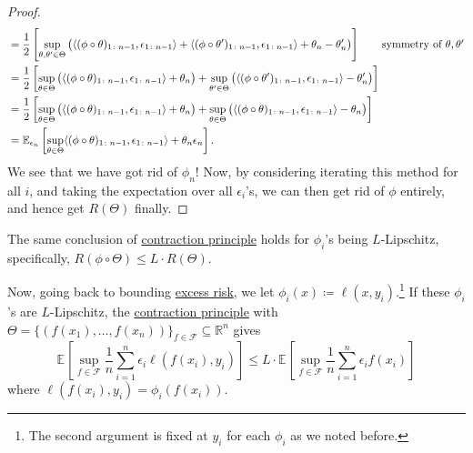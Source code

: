 \begin{proof}
\begin{align*}
		 & = \frac{1}{2} \left[ \sup _{\theta , \theta ^{\prime} \in \Theta } \big(\langle (\phi \circ \theta )_{1 \colon n-1}, \epsilon _{1 \colon n-1} \rangle+ \langle (\phi \circ \theta ^{\prime} )_{1\colon n-1} , \epsilon _{1 \colon n-1} \rangle + \theta _n - \theta _n^{\prime} \big) \right] \tag*{symmetry of \(\theta , \theta ^{\prime} \)} \\
		 & = \frac{1}{2} \left[ \sup _{\theta \in \Theta } \big( \langle (\phi \circ \theta )_{1 \colon n-1}, \epsilon _{1 \colon n-1} \rangle + \theta _n \big) + \sup _{\theta ^{\prime} \in \Theta } \big( \langle (\phi \circ \theta ^{\prime} )_{1\colon n-1} , \epsilon _{1 \colon n-1} \rangle - \theta _n^{\prime} \big) \right]                   \\
		 & = \frac{1}{2} \left[ \sup _{\theta \in \Theta } \big( \langle (\phi \circ \theta )_{1 \colon n-1}, \epsilon _{1 \colon n-1} \rangle + \theta _n \big) + \sup _{\theta \in \Theta } \big( \langle (\phi \circ \theta )_{1\colon n-1} , \epsilon _{1 \colon n-1} \rangle - \theta _n \big) \right]                                                \\
		 & = \mathbb{E}_{\epsilon _n}\left[ \sup _{\theta \in \Theta } \langle (\phi \circ \theta )_{1 \colon n-1} , \epsilon _{1 \colon n-1} \rangle + \theta _n \epsilon _n \right].
	\end{align*}
	We see that we have got rid of \(\phi _n\)! Now, by considering iterating this method for all \(i\), and taking the expectation over all \(\epsilon _i\)'s, we can then get rid of \(\phi \) entirely, and hence get \(R(\Theta )\) finally.
\end{proof}

\begin{corollary}\label{col:contraction-principle}
	The same conclusion of \hyperref[thm:contraction-principle]{contraction principle} holds for \(\phi _i\)'s being \(L\)-Lipschitz, specifically, \(R(\phi \circ \Theta ) \leq L\cdot R(\Theta )\).
\end{corollary}

Now, going back to bounding \hyperref[def:excess-risk]{excess risk}, we let \(\phi _i (x) \coloneqq \ell (x, y_i)\).\footnote{The second argument is fixed at \(y_i\) for each \(\phi _i\) as we noted before.} If these \(\phi _i\)'s are \(L\)-Lipschitz, the \hyperref[col:contraction-principle]{contraction principle} with \(\Theta = \{ (f(x_1), \dots , f(x_n)) \} _{f\in \mathscr{F} } \subseteq \mathbb{R} ^n \) gives
\[
	\mathbb{E}_{}\left[\sup _{f\in \mathscr{F} } \frac{1}{n} \sum_{i=1}^{n} \epsilon _i \ell (f(x_i), y_i) \right]
	\leq L\cdot \mathbb{E}_{}\left[\sup _{f\in \mathscr{F} } \frac{1}{n} \sum_{i=1}^{n} \epsilon _i f(x_i) \right]
\]
where \(\ell (f(x_i), y_i) = \phi _i(f(x_i))\).

